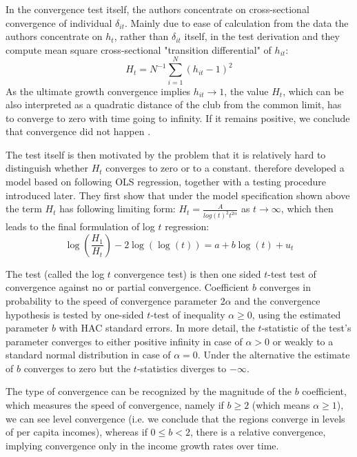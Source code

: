 \documentclass[11pt]{article}
\begin{document}
In the convergence test itself, the authors concentrate on cross-sectional convergence of individual $\delta_{it}$. Mainly due to ease of calculation from the  data the authors concentrate on $h_{t}$, rather than $\delta_{it}$ itself, in the test derivation and they compute mean square cross-sectional "transition differential" of $h_{it}$:
\begin{equation}\label{eq9}H_t = N^{-1}\sum\limits_{i=1}^N(h_{it} - 1)^2 \end{equation}
As the ultimate growth convergence implies \(h_{it} \rightarrow 1\), the value $H_{t}$, which can be also interpreted as a quadratic distance of the club from the common limit, has to converge to zero with time going to infinity. If it remains positive, we conclude that convergence did not happen \citep{phillips2009economic}.

The test itself is then motivated by the problem that it is relatively hard to distinguish whether $H_t$ converges to zero or to a constant. \citet{phillips2007transition} therefore developed a model based on following OLS regression, together with a testing procedure introduced later. They first show that under the model specification shown above the term $H_{t}$ has following limiting form: \(H_{t} = \frac{A}{log (t)^2t^{2\alpha}}\) as \(t \rightarrow \infty\), which then leads to the final formulation of log $t$ regression:
\begin{equation}\label{eq10}\log(\frac{H_1}{H_t})-2\log(\log(t)) = a + b\log(t) + u_t\end{equation}

The test (called the log $t$ convergence test) is then one sided $t$-test test of convergence against no or partial convergence. Coefficient $b$ converges in probability to the speed of convergence parameter $2\alpha$ and the convergence hypothesis is tested by one-sided $t$-test of inequality \(\alpha \geq 0 \), using the estimated parameter $b$ with HAC standard errors. In more detail, the $t$-statistic of the test's parameter converges to either positive infinity in case of \(\alpha > 0 \) or weakly to a standard normal distribution in case of \(\alpha = 0\). Under the alternative the estimate of $b$ converges to zero but the $t$-statistics diverges to $-\infty$.

 The type of convergence can be recognized by the magnitude of the $b$ coefficient, which measures the speed of convergence, namely if   $b \geq 2 $ (which means $\alpha \geq 1$), we can see level convergence (i.e. we conclude that the regions converge in levels of per capita incomes), whereas if $0 \leq  b < 2$, there is a relative convergence, implying convergence only in the income growth rates over time. 
\end{document}
